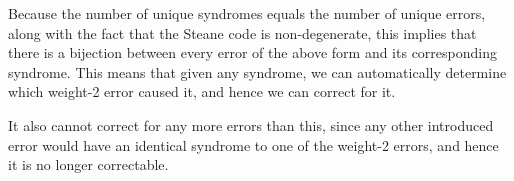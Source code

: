 \documentclass[10pt]{article}
\begin{document}
\begin{enumerate}[label=\alph*)]
			\begin{solution}
				Because the number of unique syndromes equals the number of unique errors, along with the fact that 
				the Steane code is non-degenerate, this implies that there is a bijection between every error 
				of the above form and its corresponding syndrome. This means that given any syndrome, we can 
				automatically determine which weight-2 error caused it, and hence we can correct for it. 

				It also cannot correct for any more errors than this, since any other introduced error would 
				have an identical syndrome to one of the weight-2 errors, and hence it is no longer correctable.  
			\end{solution}
	\end{enumerate}
\end{document}
